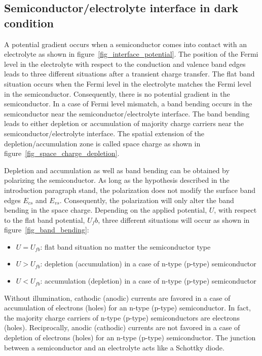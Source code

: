\subsection{Semiconductor/electrolyte interface in dark condition}
A potential gradient occurs when a semiconductor comes into contact with an 
electrolyte as shown in figure~\ref{fig_interface_potential}.
The position of the Fermi level in the electrolyte with respect to the 
conduction and valence band edges leads to three different situations after 
a transient charge transfer. 
The flat band situation occurs when the Fermi level in the electrolyte 
matches the Fermi level in the semiconductor. 
Consequently, there is no potential gradient in the semiconductor. 
In a case of Fermi level mismatch, a band bending occurs in the semiconductor 
near the semiconductor/electrolyte interface. 
The band bending leads to either depletion or accumulation of majority 
charge carriers near the semiconductor/electrolyte interface. 
The spatial extension of the depletion/accumulation zone is called space 
charge as shown in figure~\ref{fig_space_charge_depletion}.




Depletion and accumulation as well as band bending can be obtained 
by polarizing the semiconductor. 
As long as the hypothesis described in the introduction paragraph stand, 
the polarization does not modify the surface band edges $E_{cs}$ and $E_{vs}$. 
Consequently, the polarization will only alter the band bending in the space 
charge. 
Depending on the applied potential, $U$, with respect to the flat band 
potential, $U_fb$, three different situations will occur as shown in 
figure~\ref{fig_band_bending}:
\begin{itemize}
\item $U = U_{fb}$: flat band situation no matter the semiconductor type
\item $U > U_{fb}$: depletion (accumulation) in a case of n-type (p-type) semiconductor  
\item $U < U_{fb}$: accumulation (depletion) in a case of n-type (p-type) semiconductor
\end{itemize}

Without illumination, cathodic (anodic) currents are favored in a case of 
accumulation of electrons (holes) for an n-type (p-type) semiconductor. 
In fact, the majority charge carriers of n-type (p-type) semiconductors are 
electrons (holes). 
Reciprocally, anodic (cathodic) currents are not favored in a case of 
depletion of electrons (holes) for an n-type (p-type) semiconductor. 
The junction between a semiconductor and an electrolyte acts like a Schottky diode.

